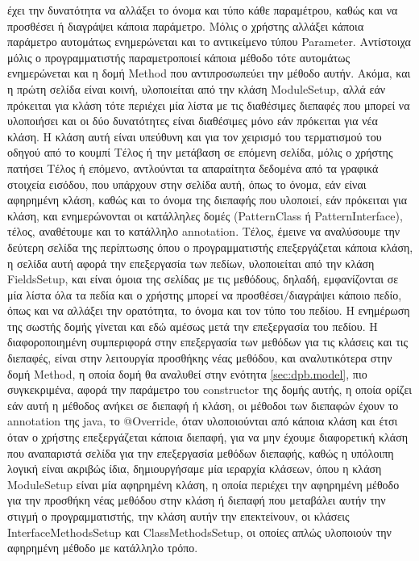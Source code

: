 έχει την δυνατότητα να αλλάξει το όνομα και τύπο κάθε παραμέτρου, καθώς και να προσθέσει ή διαγράψει κάποια παράμετρο. 
Μόλις ο χρήστης αλλάξει κάποια παράμετρο αυτομάτως ενημερώνεται και το αντικείμενο τύπου Parameter. 
Αντίστοιχα μόλις ο προγραμματιστής παραμετροποιεί κάποια μέθοδο τότε αυτομάτως ενημερώνεται και η δομή Method που αντιπροσωπεύει την μέθοδο αυτήν.
Ακόμα, και η πρώτη σελίδα είναι κοινή, υλοποιείται από την κλάση ModuleSetup, αλλά εάν πρόκειται για κλάση τότε περιέχει 
μία λίστα με τις διαθέσιμες διεπαφές που μπορεί να υλοποιήσει και οι δύο δυνατότητες 
είναι διαθέσιμες μόνο εάν πρόκειται για νέα κλάση. 
Η κλάση αυτή είναι υπεύθυνη και για τον χειρισμό του τερματισμού του οδηγού από το κουμπί Τέλος ή την μετάβαση σε επόμενη σελίδα, 
μόλις ο χρήστης πατήσει Τέλος ή επόμενο,  αντλούνται τα απαραίτητα δεδομένα από τα γραφικά στοιχεία εισόδου, 
που υπάρχουν στην σελίδα αυτή, όπως το όνομα, εάν είναι αφηρημένη κλάση, καθώς και το όνομα της διεπαφής που υλοποιεί, 
εάν πρόκειται για κλάση, και ενημερώνονται οι κατάλληλες δομές (PatternClass ή PatternInterface), τέλος, αναθέτουμε και το κατάλληλο annotation. 
Τέλος, έμεινε να αναλύσουμε την δεύτερη σελίδα της περίπτωσης όπου ο προγραμματιστής επεξεργάζεται κάποια κλάση, 
η σελίδα αυτή αφορά την επεξεργασία των πεδίων, υλοποιείται από την κλάση FieldsSetup, και είναι όμοια της σελίδας με τις μεθόδους, 
δηλαδή, εμφανίζονται σε μία λίστα όλα τα πεδία και ο χρήστης μπορεί να προσθέσει/διαγράψει κάποιο πεδίο, όπως και να αλλάξει την ορατότητα,
το όνομα και τον τύπο του πεδίου. Η ενημέρωση της σωστής δομής γίνεται και εδώ αμέσως μετά την επεξεργασία του πεδίου. 
Η διαφοροποιημένη συμπεριφορά στην επεξεργασία των μεθόδων για τις κλάσεις και τις διεπαφές, είναι στην λειτουργία προσθήκης νέας μεθόδου, 
και αναλυτικότερα στην δομή Method, η οποία δομή θα αναλυθεί στην ενότητα \ref{sec:dpb.model}, πιο συγκεκριμένα, 
αφορά  την παράμετρο του constructor της δομής αυτής, η οποία ορίζει εάν αυτή η μέθοδος ανήκει σε διεπαφή ή κλάση, 
οι μέθοδοι των διεπαφών έχουν το annotation της java, το @Override, όταν υλοποιούνται από κάποια κλάση 
και έτσι όταν ο χρήστης επεξεργάζεται κάποια διεπαφή, για να μην έχουμε διαφορετική κλάση που αναπαριστά σελίδα για την επεξεργασία μεθόδων διεπαφής, 
καθώς η υπόλοιπη λογική είναι ακριβώς ίδια, δημιουργήσαμε μία ιεραρχία κλάσεων, όπου η κλάση \mbox{ModuleSetup} είναι μία αφηρημένη κλάση, 
η οποία περιέχει την αφηρημένη μέθοδο για την προσθήκη νέας μεθόδου στην κλάση ή διεπαφή που μεταβάλει αυτήν την στιγμή ο προγραμματιστής, 
την κλάση αυτήν την επεκτείνουν, οι κλάσεις InterfaceMethodsSetup και ClassMethodsSetup, 
οι οποίες απλώς υλοποιούν την αφηρημένη μέθοδο με κατάλληλο τρόπο.

